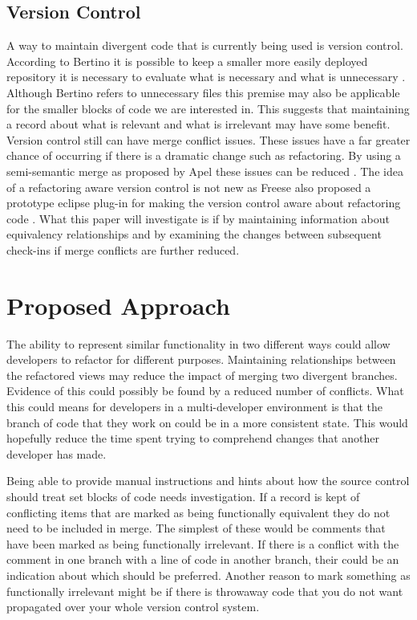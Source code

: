 \documentclass[12pt]{CRPITStyle}
\renewcommand{\cite}{\citep}
\begin{document}
\subsection{Version Control} 
A way to maintain divergent code that is currently being used is version control. According to Bertino it is possible to keep a smaller more easily deployed repository it is necessary to evaluate what is necessary and what is unnecessary \cite{Bertino2012}. Although Bertino refers to unnecessary files this premise may also be applicable for the smaller blocks of code we are interested in. This suggests that maintaining a record about what is relevant and what is irrelevant may have some benefit. Version control still can have merge conflict issues. These issues have a far greater chance of occurring if there is a dramatic change such as refactoring. By using a semi-semantic merge as proposed by Apel these issues can be reduced \cite{Apel2011}. The idea of a refactoring aware version control is not new as Freese also proposed a prototype eclipse plug-in for making the version control aware about refactoring code \cite{Freese2006}. What this paper will investigate is if by maintaining information about equivalency relationships and by examining the changes between subsequent check-ins if merge conflicts are further reduced. 
\section{Proposed Approach}
The ability to represent similar functionality in two different ways could allow developers to refactor for different purposes. Maintaining relationships between the refactored views may reduce the impact of merging two divergent branches. Evidence of this could possibly be found by a reduced number of conflicts. What this could means for developers in a multi-developer environment is that the branch of code that they work on could be in a more consistent state. This would hopefully reduce the time spent trying to comprehend changes that another developer has made. 

Being able to provide manual instructions and hints about how the source control should treat set blocks of code needs investigation. If a record is kept of conflicting items that are marked as being functionally equivalent they do not need to be included in merge. The simplest of these would be comments that have been marked as being functionally irrelevant. If there is a conflict with the comment in one branch with a line of code in another branch, their could be an indication about which should be preferred. Another reason to mark something as functionally irrelevant might be if there is throwaway code that you do not want propagated over your whole version control system. 
\end{document}
